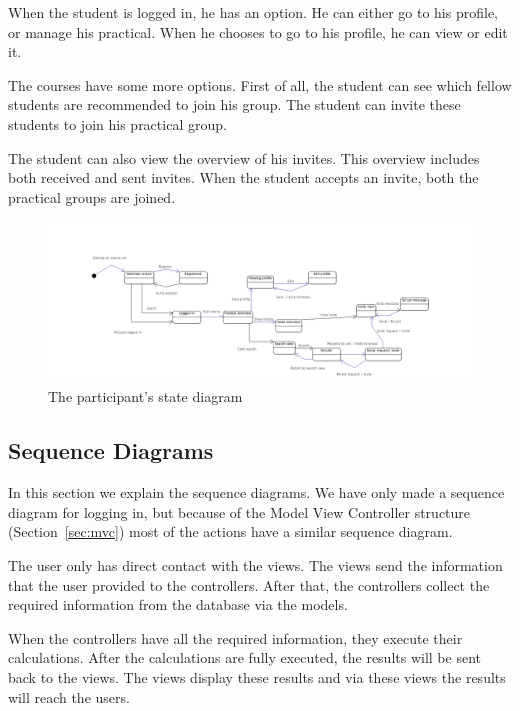 When the student is logged in, he has an option.
He can either go to his profile, or manage his practical.
When he chooses to go to his profile, he can view or edit it.

The courses have some more options.
First of all, the student can see which fellow students are recommended to join his group.
The student can invite these students to join his practical group.

The student can also view the overview of his invites.
This overview includes both received and sent invites.
When the student accepts an invite, both the practical groups are joined.

\begin{figure}[H]
    \centering
    \captionsetup{justification=centering}
    \includegraphics[width=\textwidth, frame]{images/state_diagram_participant}
    \caption{The participant's state diagram}
    \label{state_diagram_participant}
\end{figure}

\subsection{Sequence Diagrams}
In this section we explain the sequence diagrams.
We have only made a sequence diagram for logging in, but because of the Model View Controller structure (Section~\ref{sec:mvc}) most of the actions have a similar sequence diagram.

The user only has direct contact with the views.
The views send the information that the user provided to the controllers.
After that, the controllers collect the required information from the database via the models.

When the controllers have all the required information, they execute their calculations.
After the calculations are fully executed, the results will be sent back to the views.
The views display these results and via these views the results will reach the users.

